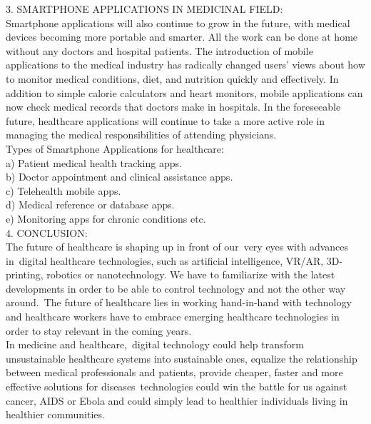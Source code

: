 \documentclass{article}
\begin{document}
3. SMARTPHONE APPLICATIONS IN MEDICINAL FIELD:\\

Smartphone applications will also continue to grow in the future, with medical devices becoming more portable and smarter.  All the work can be done at home without any doctors and hospital patients. The introduction of mobile applications to the medical industry has radically changed users' views about how to monitor medical conditions, diet, and nutrition quickly and effectively. In addition to simple calorie calculators and heart monitors, mobile applications can now check medical records that doctors make in hospitals. In the foreseeable future, healthcare applications will continue to take a more active role in managing the medical responsibilities of attending physicians.\\
Types of Smartphone Applications for healthcare:\\
a) Patient medical health tracking apps.\\
b) Doctor appointment and clinical assistance apps.\\
c) Telehealth mobile apps.\\
d) Medical reference or database apps.\\
e) Monitoring apps for chronic conditions etc.\\

4. CONCLUSION:\\

The future of healthcare is shaping up in front of our very eyes with advances in digital healthcare technologies, such as artificial intelligence, VR/AR, 3D-printing, robotics or nanotechnology. We have to familiarize with the latest developments in order to be able to control technology and not the other way around. The future of healthcare lies in working hand-in-hand with technology and healthcare workers have to embrace emerging healthcare technologies in order to stay relevant in the coming years.\\
In medicine and healthcare, digital technology could help transform unsustainable healthcare systems into sustainable ones, equalize the relationship between medical professionals and patients, provide cheaper, faster and more effective solutions for diseases technologies could win the battle for us against cancer, AIDS or Ebola and could simply lead to healthier individuals living in healthier communities.



%
%
\end{document}
